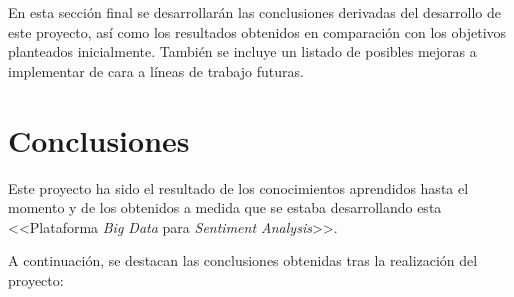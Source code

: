 
En esta sección final se desarrollarán las conclusiones derivadas del desarrollo de este proyecto, así como los resultados obtenidos en comparación con los objetivos planteados inicialmente. También se incluye un listado de posibles mejoras a implementar de cara a líneas de trabajo futuras.

\section{Conclusiones}

Este proyecto ha sido el resultado de los conocimientos aprendidos hasta el momento y de los obtenidos a medida que se estaba desarrollando esta <<Plataforma \textit{Big Data} para \textit{Sentiment Analysis}>>.

A continuación, se destacan las conclusiones obtenidas tras la realización del proyecto:

